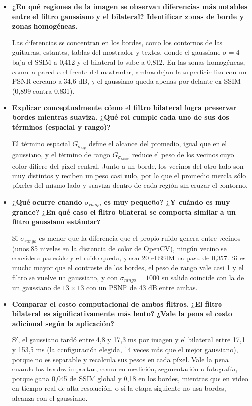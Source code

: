         \begin{itemize}[leftmargin=*]
            \item \textbf{¿En qué regiones de la imagen se observan diferencias más notables entre el filtro gaussiano y el bilateral? Identificar zonas de borde y zonas homogéneas.}

                Las diferencias se concentran en los bordes, como los contornos de las guitarras, estantes, tablas del mostrador y textos, donde el gaussiano $\sigma=4$ baja el SSIM a 0,412 y el bilateral lo sube a 0,812. En las zonas homogéneas, como la pared o el frente del mostrador, ambos dejan la superficie lisa con un PSNR cercano a 34,6 dB, y el gaussiano queda apenas por delante en SSIM (0,899 contra 0,831).

            \item \textbf{Explicar conceptualmente cómo el filtro bilateral logra preservar bordes mientras suaviza. ¿Qué rol cumple cada uno de sus dos términos (espacial y rango)?}

                El término espacial $G_{\sigma_{esp}}$ define el alcance del promedio, igual que en el gaussiano, y el término de rango $G_{\sigma_{rango}}$ reduce el peso de los vecinos cuyo color difiere del píxel central. Junto a un borde, los vecinos del otro lado son muy distintos y reciben un peso casi nulo, por lo que el promedio mezcla sólo píxeles del mismo lado y suaviza dentro de cada región sin cruzar el contorno.

            \item \textbf{¿Qué ocurre cuando $\sigma_{rango}$ es muy pequeño? ¿Y cuándo es muy grande? ¿En qué caso el filtro bilateral se comporta similar a un filtro gaussiano estándar?}

                Si $\sigma_{rango}$ es menor que la diferencia que el propio ruido genera entre vecinos (unos 85 niveles en la distancia de color de OpenCV), ningún vecino se considera parecido y el ruido queda, y con 20 el SSIM no pasa de 0,357. Si es mucho mayor que el contraste de los bordes, el peso de rango vale casi 1 y el filtro se vuelve un gaussiano, y con $\sigma_{rango}=1000$ su salida coincide con la de un gaussiano de $13\times13$ con un PSNR de 43 dB entre ambas.

            \item \textbf{Comparar el costo computacional de ambos filtros. ¿El filtro bilateral es significativamente más lento? ¿Vale la pena el costo adicional según la aplicación?}

                Sí, el gaussiano tardó entre 4,8 y 17,3 ms por imagen y el bilateral entre 17,1 y 153,5 ms (la configuración elegida, 14 veces más que el mejor gaussiano), porque no es separable y recalcula sus pesos en cada píxel. Vale la pena cuando los bordes importan, como en medición, segmentación o fotografía, porque gana 0,045 de SSIM global y 0,18 en los bordes, mientras que en video en tiempo real de alta resolución, o si la etapa siguiente no usa bordes, alcanza con el gaussiano.


\end{itemize}
